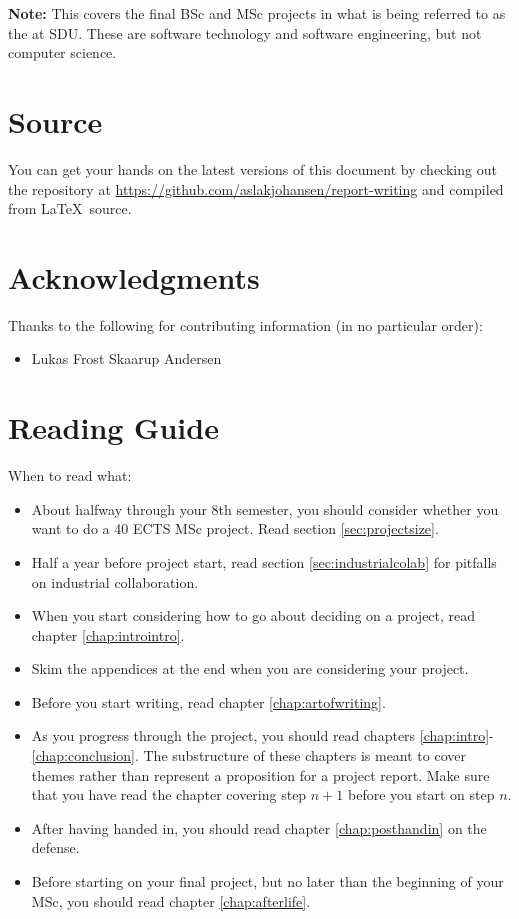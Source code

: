 \documentclass[a4paper, oneside]{memoir}
\newcommand{\quoted}[1]{\textsl{\say{#1}}}
\begin{document}
\textbf{Note:} This covers the final BSc and MSc projects in what is being referred to as the \quoted{software educations} at SDU. These are software technology and software engineering, but not computer science.

\section{Source}
\label{sec:source}

You can get your hands on the latest versions of this document by checking out the repository at \url{https://github.com/aslakjohansen/report-writing} and compiled from \LaTeX\ source.

\section{Acknowledgments}

Thanks to the following for contributing information (in no particular order):
\begin{itemize}
  \item Lukas Frost Skaarup Andersen %
\end{itemize}

\section{Reading Guide}

When to read what:
\begin{itemize}
  \item About halfway through your 8th semester, you should consider whether you want to do a 40 ECTS MSc project. Read section \ref{sec:projectsize}.
  \item Half a year before project start, read section \ref{sec:industrialcolab} for pitfalls on industrial collaboration.
  \item When you start considering how to go about deciding on a project, read chapter \ref{chap:introintro}.
  \item Skim the appendices at the end when you are considering your project.
  \item Before you start writing, read chapter \ref{chap:artofwriting}.
  \item As you progress through the project, you should read chapters \ref{chap:intro}-\ref{chap:conclusion}. The substructure of these chapters is meant to cover themes rather than represent a proposition for a project report. Make sure that you have read the chapter covering step $n+1$ before you start on step $n$.
  \item After having handed in, you should read chapter \ref{chap:posthandin} on the defense.
  \item Before starting on your final project, but no later than the beginning of your MSc, you should read chapter \ref{chap:afterlife}.
\end{itemize}
\end{document}
